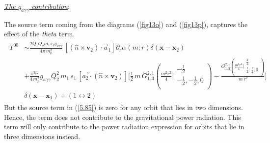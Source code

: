 \underline{{\textit{ The $g_{a\gamma\gamma}$ contribution}}}:\par
The source term coming from the diagrams (\ref{fig13o}) and (\ref{fig13p}), captures the effect of the \textit{theta} term.  %
\begin{align}
\begin{split}
T^{00}&\sim
\frac{2Q_1Q_2m_1s_1g_{a\gamma \gamma}}{4\pi\,m_p^2}\, [(\hat n\times \boldsymbol{v}_2)\cdot \Vec{a}_1]
\partial_r\alpha(m;r) \delta(\boldsymbol{x}-\boldsymbol{x}_2)\\&
   + \frac{\pi^{3/2}}{4\,m_p^2}g_{a\gamma\gamma}Q_2^2\,m_1\,s_1\,[\Vec{a_2}\cdot(\hat{n}\times\boldsymbol{v}_2)]\Bigg[\frac{1}{2}\, m \,G_{1,3}^{2,1}\left(\frac{m^2 r^2}{4}\Big|
\begin{array}{c}
 -\frac{1}{2} \\
 -\frac{1}{2},-\frac{1}{2},0 \\
\end{array}
\right)-\frac{ G_{1,3}^{2,1}\left(\frac{m^2 r^2}{4}\Big|
\begin{array}{c}
 \frac{1}{2} \\
 \frac{1}{2},\frac{1}{2},0 \\
\end{array}
\right)}{ \,m\, r^2}\Bigg]\\&\delta(\boldsymbol{x}-\boldsymbol{x}_1)+(1\leftrightarrow 2)\label{5.85}
\end{split}
\end{align}
But the source term in (\ref{5.85}) is zero for any orbit that lies in two dimensions. Hence, the term does not contribute to the gravitational power radiation. This term will only contribute to the power radiation expression for orbits that lie in three dimensions instead.\par

\begin{table}[t!]
 \centering
{}
\caption{Table showing the number of diagrams contributing to each $N^{(n)}LO$ for different radiative fields. We exclude the pure gravitational sector, which is already extensively studied (see \cite{Blanchet:2013haa}), and list only contributions from interactions of other fields with gravity.}
 \label{table2m}
 \end{table}
 
